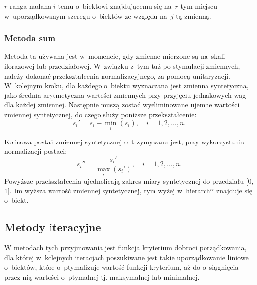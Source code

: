 \documentclass[12pt,a4paper]{report}
\begin{document}
$r$-ranga nadana $i$-temu o~biektowi znajdującemu się na~$r$-tym miejscu w~uporządkowanym
szeregu o~biektów ze względu na~$j$-tą zmienną.


\subsubsection{Metoda sum}


Metoda ta używana jest w~momencie, gdy zmienne mierzone są na~skali ilorazowej lub przedziałowej. W~związku z~tym tuż po stymulacji zmiennych, należy dokonać przekształcenia normalizacyjnego, za pomocą unitaryzacji. W~kolejnym kroku, dla każdego o~biektu wyznaczana jest zmienna syntetyczna, jako średnia arytmetyczna wartości zmiennych przy przyjęciu jednakowych wag dla każdej zmiennej.
Następnie muszą zostać wyeliminowane ujemne wartości zmiennej syntetycznej, do czego służy poniższe przekształcenie:
$$
s_{i}'=s_{i}-\min\limits_{i}(s_i), \quad i=1, 2, \ldots, n.
$$

Końcowa postać zmiennej syntetycznej o~trzymywana jest, przy wykorzystaniu normalizacji postaci: %
$$
s_{i}''=\frac{s_{i}'}{\max\limits_{i}(s_{i}')},\quad i=1, 2, \ldots, n.
$$
Powyższe przekształcenia ujednolicają zakres miary syntetycznej do przedziału [0, 1]. Im wyższa wartość zmiennej syntetycznej, tym wyżej w~hierarchii znajduje się o~biekt.%


\subsection{Metody iteracyjne}

W metodach tych przyjmowania jest funkcja kryterium dobroci porządkowania, dla której w~kolejnych iteracjach poszukiwane jest takie uporządkowanie liniowe o~biektów, które o~ptymalizuje wartość funkcji kryterium, aż do o~siągnięcia przez nią wartości o~ptymalnej tj. maksymalnej lub minimalnej. 
\end{document}
